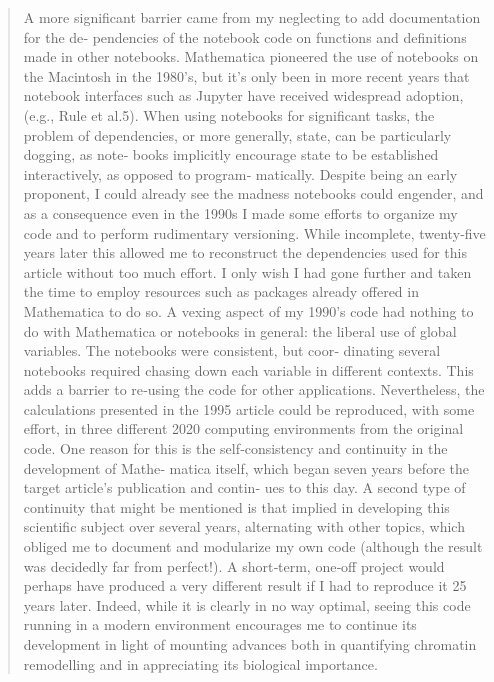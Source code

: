 \begin{quotation}
A more significant barrier came from my neglecting to add documentation for the
de‐ pendencies of the notebook code on functions and definitions made in other
notebooks. Mathematica pioneered the use of notebooks on the Macintosh in the
1980’s, but it’s only been in more recent years that notebook interfaces such as
Jupyter have received widespread adoption, (e.g., Rule et al.5). When using
notebooks for significant tasks, the problem of dependencies, or more generally,
state, can be particularly dogging, as note‐ books implicitly encourage state to
be established interactively, as opposed to program‐ matically. Despite being an
early proponent, I could already see the madness notebooks could engender, and
as a consequence even in the 1990s I made some efforts to organize my code and
to perform rudimentary versioning. While incomplete, twenty‐five years later
this allowed me to reconstruct the dependencies used for this article without
too much effort. I only wish I had gone further and taken the time to employ
resources such as packages already offered in Mathematica to do so. A vexing
aspect of my 1990’s code had nothing to do with Mathematica or notebooks in
general: the liberal use of global variables. The notebooks were consistent, but
coor‐ dinating several notebooks required chasing down each variable in
different contexts. This adds a barrier to re‐using the code for other
applications. Nevertheless, the calculations presented in the 1995 article could
be reproduced, with some effort, in three different 2020 computing environments
from the original code. One reason for this is the self‐consistency and
continuity in the development of Mathe‐ matica itself, which began seven years
before the target article’s publication and contin‐ ues to this day. A second
type of continuity that might be mentioned is that implied in developing this
scientific subject over several years, alternating with other topics, which
obliged me to document and modularize my own code (although the result was
decidedly far from perfect!). A short‐term, one‐off project would perhaps have
produced a very different result if I had to reproduce it 25 years later.
Indeed, while it is clearly in no way optimal, seeing this code running in a
modern environment encourages me to continue its development in light of
mounting advances both in quantifying chromatin remodelling and in appreciating
its biological importance.
\end{quotation}

\subsection{\cite{fiordelmondo_towards_2025}}

